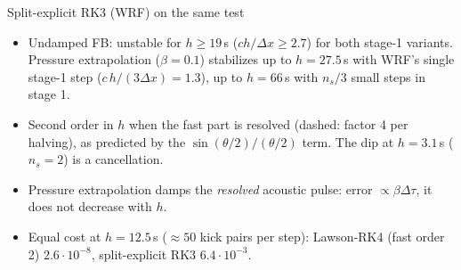 \documentclass[aspectratio=169,10pt]{beamer}
\begin{document}
\begin{frame}{Split-explicit RK3 (WRF) on the same test}
\begin{center}
  \end{center}
  \vspace{-0.6em}
  \scriptsize
  \begin{itemize}
    \item Undamped FB: unstable for $h\ge19$\,s ($ch/\Delta x\ge2.7$) for both stage-1 variants. Pressure extrapolation ($\beta=0.1$) stabilizes up to
    $h=27.5$\,s with WRF's single stage-1 step ($c\,h/(3\Delta x)=1.3$), up to $h=66$\,s with $n_s/3$ small steps in stage 1.
    \item Second order in $h$ when the fast part is resolved (dashed: factor 4 per halving), as predicted by the $\sin(\theta/2)/(\theta/2)$ term. The dip at $h=3.1$\,s ($n_s=2$) is a cancellation.
    \item Pressure extrapolation damps the \emph{resolved} acoustic pulse: error $\propto\beta\Delta\tau$, it does not decrease with $h$.
    \item Equal cost at $h=12.5$\,s ($\approx50$ kick pairs per step): Lawson-RK4 (fast order 2) $2.6\cdot10^{-8}$, split-explicit RK3 $6.4\cdot10^{-3}$.
  \end{itemize}
\end{frame}
\end{document}
